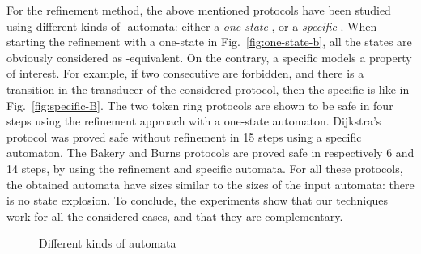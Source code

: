 \documentclass[]{llncs}
\begin{document}
For the refinement method, the above mentioned protocols have been studied using
different kinds of -automata: either a {\it one-state} , or a
{\it specific} .  When starting the refinement with a one-state
 in Fig.~\ref{fig:one-state-b}, all the states are obviously
considered as -equivalent. On the contrary, a specific  models
a property of interest. For example, if two consecutive  are
forbidden, and there is a transition  in the
transducer of the considered protocol, then the
specific  is like in Fig.~\ref{fig:specific-B}.  The two token
ring protocols are shown to be safe  in four
steps using the refinement approach with a one-state automaton. Dijkstra's protocol was proved
safe without refinement in 15 steps using a specific automaton. The
Bakery and Burns protocols are proved safe  in respectively 6 and 14 steps, by 
using the refinement and specific automata. For all these
protocols, the obtained automata have sizes similar to the sizes of
the input automata: there is no state explosion. To conclude, the experiments show that our techniques work for all the
considered cases,  and that they are complementary. 



\begin{figure}[tb]
\hfill
{}\hfill
{}
\hfill
\caption{Different kinds of  automata}
\end{figure}
\end{document}

